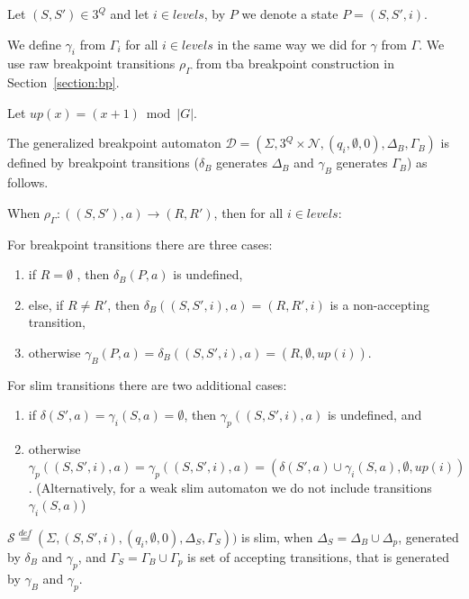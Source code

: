 \documentclass[
	digital,
nolof, nolot
]{fithesis3}
\newcommand{\cD}{\mathcal{D}}
\newcommand{\cN}{\mathcal{N}}
\newcommand{\cS}{\mathcal{S}}
\newcommand{\eqdef}{\overset{def}{=}}
\begin{document}
			
			Let $(S,S')\in 3^Q$ and let $i \in levels$, by $P$ we denote a state $P=(S,S',i)$.
			
			We define $\gamma_i$ from $\Gamma_i$ for all $i \in levels$ in the same way we did for $\gamma$ from $\Gamma$. We use raw breakpoint transitions $\rho_{\Gamma}$ from tba breakpoint construction in Section~\ref{section:bp}.
			
			Let $up(x)=(x+1)\bmod|G|$.
			
			The generalized breakpoint automaton $\cD=(\Sigma, 3^Q\times\cN, ({q_i},\emptyset, 0),\Delta_B,\Gamma_B)$ is defined by breakpoint transitions ($\delta_B$ generates $\Delta_B$ and $\gamma_B$ generates $\Gamma_B$) as follows.
			
			When $\rho_{\Gamma} \colon((S,S'), a) \rightarrow (R, R')$, then for all $i \in levels$:
			
			For breakpoint transitions there are three cases:
			
			\begin{enumerate}
				\item if $R=\emptyset$ , then $\delta_B(P,a)$ is undefined,
				\item else, if $R \neq R'$, then $\delta_B((S,S',i),a) = (R,R',i)$ is a non-accepting transition,
				\item otherwise $\gamma_B(P, a) = \delta_B((S,S',i),a) = (R, \emptyset, up(i))$.
			\end{enumerate}
		
		
			For slim transitions there are two additional cases:
			\begin{enumerate}
				\item if $\delta(S',a)=\gamma_{i}(S, a)=\emptyset$, then $ \gamma_{p}((S,S',i),a)$ is undefined, and
				\item otherwise $\gamma_p((S,S',i),a) = \gamma_p((S,S',i),a) = (\delta(S',a)\cup \gamma_{i}(S, a), \emptyset, up(i))$. (Alternatively, for a weak slim automaton we do not include transitions $\gamma_{i}(S, a)$)
			\end{enumerate}
			$\cS\eqdef(\Sigma, (S,S',i), (q_i,\emptyset,0), \Delta_S,\Gamma_S))$ is slim, when $\Delta_S=\Delta_B\cup\Delta_p$, generated by $\delta_B$ and $\gamma_p$, and $\Gamma_S=\Gamma_B\cup\Gamma_p$ is set of accepting transitions, that is generated by $\gamma_B$ and $\gamma_p$.
			
\end{document}
